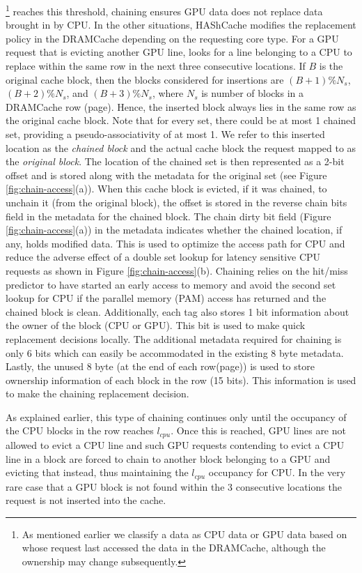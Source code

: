 \footnote{As mentioned earlier we classify a data as CPU data or GPU data based on whose request last accessed the data in the DRAMCache, although the ownership may change subsequently.} 
reaches this threshold, chaining ensures GPU data does not replace data brought in by CPU. 
In the other situations, HAShCache modifies the replacement policy in the DRAMCache depending on the requesting core type. For a GPU request that is evicting another GPU line, \cachename looks for a line belonging to a CPU to replace within the same row in the next three consecutive locations.  
If $B$ is the original cache block, then the blocks considered for insertions are $(B+1)\%N_s$,$(B+2)\%N_s$, and $(B+3)\%N_s$, where $N_s$ is number of blocks in a DRAMCache row (page). Hence, the inserted block always lies in the same row as the original cache block. Note that for every set, there could be at most 1 chained set, providing a pseudo-associativity of at most 1.  
We refer to this inserted location as the \textit{chained block} and the actual cache block the request mapped to as the \textit{original block}. The location of the chained set is then represented as a 2-bit offset and is stored along with the metadata for the original set (see Figure \ref{fig:chain-access}(a)). When this cache block is evicted, if it was chained, to unchain it (from the original block), the offset is stored in the reverse chain bits field in  the metadata for the chained block.  
The chain dirty bit field (Figure \ref{fig:chain-access}(a)) in the metadata indicates whether the chained location, if any, holds modified data. This is used to optimize the access path for CPU and reduce the adverse effect of a double set lookup for latency sensitive CPU requests as shown in Figure \ref{fig:chain-access}(b). Chaining relies on the hit/miss predictor to have started an early access to memory and avoid the second set lookup for CPU if the parallel memory (PAM) access has returned and the chained block is clean. 
Additionally, each tag also stores 1 bit information about the owner of the block (CPU or GPU). This bit is used to make quick replacement decisions locally. The additional metadata required for chaining is only 6 bits which can easily be accommodated in the existing 8 byte metadata. Lastly, the unused 8 byte (at the end of each row(page)) is used to store ownership information of each block in the row (15 bits). This information is used to make the chaining replacement decision.

\par As explained earlier, this type of chaining continues only until the occupancy of the CPU blocks in the row reaches \textit{$l_{cpu}$}. Once this is reached, GPU lines are not allowed to evict a CPU line and such GPU requests contending to evict a CPU line in a block are forced to chain to another block belonging to a GPU and evicting that instead, thus maintaining the \textit{$l_{cpu}$} occupancy for CPU. In the very rare case that a GPU block is not found within the 3 consecutive locations the request is not inserted into the cache.

